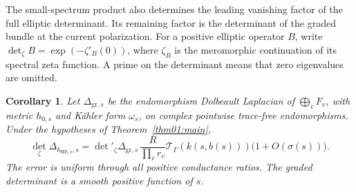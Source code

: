 \documentclass[11pt]{amsart}
\newtheorem{corollary}[theorem]{Corollary}
\theoremstyle{definition}
\theoremstyle{remark}
\begin{document}
The small-spectrum product also determines the leading vanishing
factor of the full elliptic determinant. Its remaining factor is
the determinant of the graded bundle at the current polarization.
For a positive elliptic operator \(B\), write
\(\det_\zeta B=\exp(-\zeta'_B(0))\), where \(\zeta_B\)
is the meromorphic continuation of its spectral zeta function.
A prime on the determinant means that zero eigenvalues are omitted.

\begin{corollary}\label{cor06:determinant}
Let \(\Delta_{\mathrm{gr},s}\) be the endomorphism Dolbeault
Laplacian of \(\bigoplus_vF_v\), with metric \(h_{0,s}\) and
Kähler form \(\omega_s\), on complex pointwise trace-free
endomorphisms. Under the hypotheses of Theorem~\ref{thm01:main},
\begin{equation}\label{eq06:determinant}
 \det_\zeta\Delta_{h_{\mathrm{HE},s},s}
 =\det'_\zeta\Delta_{\mathrm{gr},s}\,
   \frac{R}{\prod_vr_v}\mathcal T_\Gamma(k(s,b(s)))
                         \bigl(1+O(\sigma(s))\bigr).
\end{equation}
The error is uniform through all positive conductance ratios.
The graded determinant is a smooth positive function of \(s\).
\end{corollary}
\end{document}

